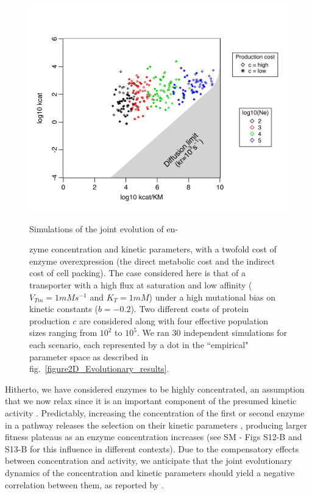 \begin{figure}[h!]
\centering
\begin{minipage}[c]{0.5\linewidth}
\includegraphics[scale=0.65,trim=0.25cm 0cm 0cm 0.75cm,clip]{pics/Enzymes/Evo_Results_CostCrow_PaperModM.jpeg}
\caption{Simulations of the joint evolution of en-}
\label{figure2D_Evolutionary_results_HF}
\end{minipage}
\hspace{0.5cm}\hfill
\begin{minipage}[c]{0.42\linewidth}
\caption*{zyme concentration and kinetic parameters, with a twofold cost of enzyme overexpression (the direct metabolic cost and the indirect cost of cell packing). The case considered here is that of a transporter with a high flux at saturation and low affinity ($V_{Tm}=1 mMs^{-1}$ and $K_T=1mM$) under a high mutational bias on kinetic constants ($b=-0.2$). Two different costs of protein production $c$ are considered along with four effective population sizes ranging from $10^2$ to $10^5$. We ran 30 independent simulations for each scenario, each represented by a dot in the ``empirical" parameter space as described in fig.~\ref{figure2D_Evolutionary_results}.
}
\end{minipage}
\end{figure}

Hitherto, we have considered enzymes to be highly concentrated, an assumption that we now relax since it is an important component of the presumed kinetic activity \citep{Koshland02}. Predictably, increasing the concentration of the first or second enzyme in a pathway releases the selection on their kinetic parameters \citep{Noor16}, producing larger fitness plateaus as an enzyme concentration increases (see SM - Figs S12-B and S13-B for this influence in different contexts). Due to the compensatory effects between concentration and activity, we anticipate that the joint evolutionary dynamics of the concentration and kinetic parameters should yield a negative correlation between them, as reported by \citet{Davidi16,Davidi18}. 

